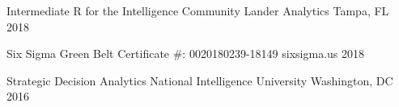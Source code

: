 

\begin{cvhonors}

  \cvhonor
    {Intermediate R for the Intelligence Community} %
    {Lander Analytics} %
    {Tampa, FL} %
    {2018} %

  \cvhonor
    {Six Sigma Green Belt} %
    {Certificate \#: 0020180239-18149} %
    {sixsigma.us} %
    {2018} %
    
  \cvhonor
    {Strategic Decision Analytics} %
    {National Intelligence University} %
    {Washington, DC} %
    {2016} %

\end{cvhonors}